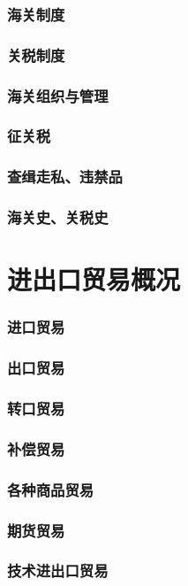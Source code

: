 \documentclass[UTF8]{../../RepresentationUniverse}
\begin{document}
    \subsubsection{海关制度}
    \subsubsection{关税制度}
    \subsubsection{海关组织与管理}
    \subsubsection{征关税}
    \subsubsection{查缉走私、违禁品}
    \subsubsection{海关史、关税史}
\section{进出口贸易概况}
    \subsubsection{进口贸易}
    \subsubsection{出口贸易}
    \subsubsection{转口贸易}
    \subsubsection{补偿贸易}
    \subsubsection{各种商品贸易}
    \subsubsection{期货贸易}
    \subsubsection{技术进出口贸易}
\end{document}
